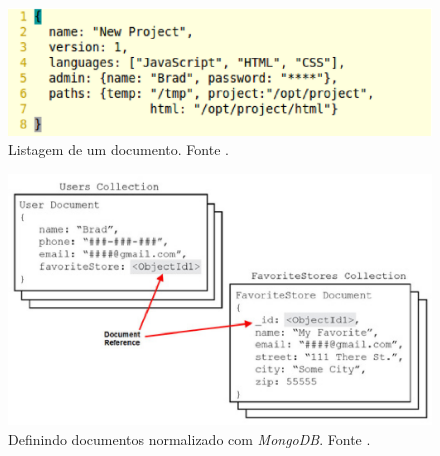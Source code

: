 \begin{figure}[ht]
	\centering
	\includegraphics[width=12cm]{figuras/listagem1.eps}
	\caption{Listagem de um documento. Fonte \cite{Dayley2014}.}
	\label{listagem1}
\end{figure}

\begin{figure}[ht]
	\centering
	\includegraphics[width=12cm]{figuras/normalizacao.eps}
	\caption{Definindo documentos normalizado com \emph{MongoDB}. Fonte \cite{Dayley2014}.}
	\label{normalizacao}
\end{figure}
